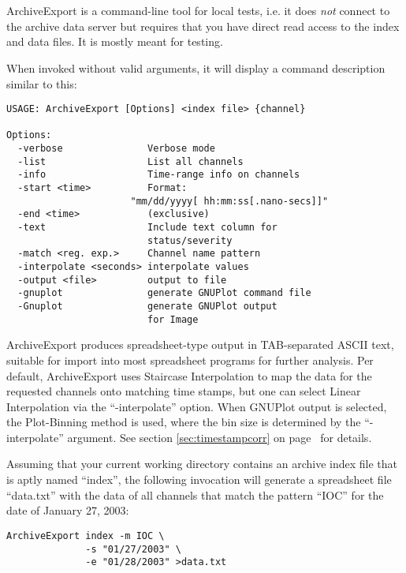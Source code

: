 \section{}
ArchiveExport is a command-line tool for local tests, i.e. it does
\emph{not} connect to the archive data server but requires that
you have direct read access to the index and data files.
It is mostly meant for testing.

When invoked without valid arguments, it will display a command
description similar to this:

\begin{lstlisting}[frame=none,keywordstyle=\sffamily]
USAGE: ArchiveExport [Options] <index file> {channel}
 
Options:
  -verbose               Verbose mode
  -list                  List all channels
  -info                  Time-range info on channels
  -start <time>          Format:
                      "mm/dd/yyyy[ hh:mm:ss[.nano-secs]]"
  -end <time>            (exclusive)
  -text                  Include text column for
                         status/severity
  -match <reg. exp.>     Channel name pattern
  -interpolate <seconds> interpolate values
  -output <file>         output to file
  -gnuplot               generate GNUPlot command file
  -Gnuplot               generate GNUPlot output
                         for Image
\end{lstlisting}

\noindent ArchiveExport produces spreadsheet-type output in
TAB-separated ASCII text, suitable for import into most spreadsheet
programs for further analysis. Per default, ArchiveExport uses
Staircase Interpolation to map the data for the requested channels
onto matching time stamps, but one can select Linear Interpolation via
the ``-interpolate'' option. When GNUPlot output is selected, the
Plot-Binning method is used, where the bin size is determined by the
``-interpolate'' argument. See section \ref{sec:timestampcorr} on
page~\pageref{sec:timestampcorr} for details.

Assuming that your current working directory contains an
archive index file that is aptly named ``index'', the following
invocation will generate a spreadsheet file ``data.txt'' with the data
of all channels that match the pattern ``IOC'' for the date of January
27, 2003:

\begin{lstlisting}[frame=none,keywordstyle=\sffamily]
ArchiveExport index -m IOC \
              -s "01/27/2003" \
              -e "01/28/2003" >data.txt
\end{lstlisting}


